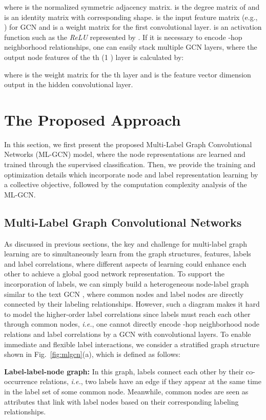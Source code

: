 \documentclass[conference]{IEEEtran}
\begin{document}
where  is the normalized symmetric adjacency matrix.  is the degree matrix of  and  is an identity matrix with corresponding shape.  is the input feature matrix (e.g.,  ) for GCN and  is a weight matrix for the first convolutional layer.  is an activation function such as the \textit{ReLU} represented by . If it is necessary to encode -hop neighborhood relationships, one can easily stack multiple GCN layers, where the output node features of the th (1    ) layer is calculated by:

where  is the weight matrix for the th layer and  is the feature vector dimension output in the hidden convolutional layer.

\section{The Proposed Approach}
In this section, we first present the proposed Multi-Label Graph Convolutional Networks (ML-GCN) model, where the node representations are learned and trained through the supervised classification. Then, we provide the training and optimization details which incorporate node and label representation learning by a collective objective, followed by the computation complexity analysis of the ML-GCN.
\subsection{Multi-Label Graph Convolutional Networks}
As discussed in previous sections, the key and challenge for multi-label graph learning are to simultaneously learn from the graph structures, features, labels and label correlations, where different aspects of learning could enhance each other to achieve a global good network representation. To support the incorporation of labels, we can simply build a heterogeneous node-label graph similar to the text GCN \cite{25}, where common nodes and label nodes are directly connected by their labeling relationships. However, such a diagram makes it hard to model the higher-order label correlations since labels must reach each other through common nodes, \textit{i.e.}, one cannot directly encode -hop neighborhood node relations and label correlations by a GCN with  convolutional layers. To enable immediate and flexible label interactions, we consider a stratified graph structure shown in Fig.~\ref{fig:mlgcn}(a), which is defined as follows:

\noindent \textbf{Label-label-node graph:} In this graph, labels connect each other by their co-occurrence relations, \textit{i.e.}, two labels have an edge if they appear at the same time in the label set of some common node. Meanwhile, common nodes are seen as attributes that link with label nodes based on their corresponding labeling relationships.
\end{document}
